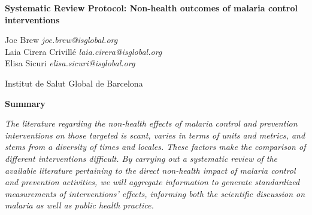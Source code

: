 \documentclass{article}
\begin{document}


\vspace{20mm}


\begin{Huge}
\begin{center}
\textbf{Systematic Review Protocol: Non-health outcomes of malaria control interventions}
\end{center}
\end{Huge}



\vspace{5mm}

\begin{changemargin}{2.5cm}{2.5cm} 
\begin{center}
\begin{large}
Joe Brew \hfill \emph{joe.brew@isglobal.org} \\
Laia Cirera Crivillé \hfill \emph{laia.cirera@isglobal.org} \\ 
Elisa Sicuri \hfill \emph{elisa.sicuri@isglobal.org} \\ 
\end{large}
\end{center}
\end{changemargin}


\vspace{6mm}

\begin{center}
\begin{large}
Institut de Salut Global de Barcelona 
\end{large}
\end{center}


\begin{changemargin}{3cm}{3cm} 

\begin{center}
\textbf{Summary}
\end{center}

\emph{The literature regarding the non-health effects of malaria control and prevention interventions on those targeted is scant, varies in terms of units and metrics, and stems from a diversity of times and locales. These factors make the comparison of different interventions difficult. By carrying out a systematic review of the available literature pertaining to the direct non-health impact of malaria control and prevention activities, we will aggregate information to generate standardized measurements of interventions' effects, informing both the scientific discussion on malaria as well as public health practice.}

\end{changemargin}
\end{document}
